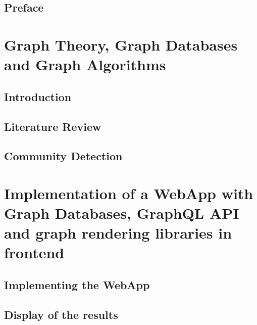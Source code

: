 \setcounter{chapter}{-1}

\chapter{Preface} \label{Preface}
\label{\chaptername::\thechapter}


\cleardoublepage\begingroup\makeatletter\let\ps@plain\ps@empty%
	\part{Graph Theory, Graph Databases and Graph Algorithms}
\endgroup

\chapter{Introduction} \label{chapter:Introduction}
\label{\chaptername::\thechapter}
\setcounter{mtc}{12}%
\iftodos{\setcounter{mtc}{13}}


\chapter{Literature Review} \label{chapter:LiteratureReview} \label{\chaptername::\thechapter}


\chapter{Community Detection} \label{chapter:CommunityDetection} \label{\chaptername::\thechapter}


\cleardoublepage\begingroup\makeatletter\let\ps@plain\ps@empty%
	\part{Implementation of a WebApp with Graph Databases, GraphQL API and graph rendering libraries in front\-end}
\endgroup

\chapter{Implementing the WebApp} \label{chapter:ImplementingtheWebApp} \label{\chaptername::\thechapter}


\chapter{Display of the results} \label{chapter:Displayoftheresults} \label{\chaptername::\thechapter}


